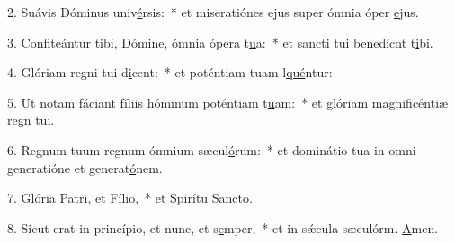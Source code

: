 2. Suávis Dóminus univ\uline{é}rsis:~* et miseratiónes ejus super ómnia óper \uline{e}jus.\par 
3. Confiteántur tibi, Dómine, ómnia ópera t\uline{u}a:~* et sancti tui benedícnt t\uline{i}bi.\par 
4. Glóriam regni tui d\uline{i}cent:~* et poténtiam tuam l\uline{qué}ntur:\par 
5. Ut notam fáciant fíliis hóminum poténtiam t\uline{u}am:~* et glóriam magnificéntiæ regn t\uline{u}i.\par 
6. Regnum tuum regnum ómnium sæcul\uline{ó}rum:~* et dominátio tua in omni generatióne et generat\uline{ó}nem.\par 
7. Glória Patri, et F\uline{í}lio,~* et Spirítu S\uline{a}ncto.\par 
8. Sicut erat in princípio, et nunc, et s\uline{e}mper,~* et in sǽcula sæculórm. \uline{A}men.\par 
